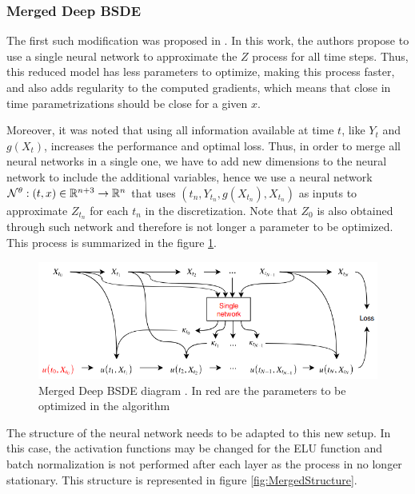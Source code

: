 \subsubsection*{Merged Deep BSDE}
The first such modification was proposed in \cite{chan-wai-nam_machine_2018}. In this work, the authors propose to use a single neural network to approximate the $Z$ process for all time steps. Thus, this reduced model has less parameters to optimize, making this process faster, and also adds regularity to the computed gradients, which means that close in time parametrizations should be close for a given $x$.

Moreover, it was noted that using all information available at time $t$, like $Y_t$ and $g(X_t)$, increases the performance and optimal loss. Thus, in order to merge all neural networks in a single one, we have to add new dimensions to the neural network to include the additional variables, hence we use a neural network $\mathcal{N}^{\theta}:(t,x)\in \mathbb{R}^{n+3}\to\mathbb{R}^n$ that uses $(t_n,Y_{t_n},g(X_{t_n}),X_{t_n})$ as inputs to approximate $Z_{t_{n}}$ for each $t_n$ in the discretization. Note that $Z_0$ is also obtained through such network and therefore is not longer a parameter to be optimized. This process is summarized in the figure \ref{fig:mergeddeepbsdemap}.
\begin{figure}[H]
	\centering
	\includegraphics[width=\linewidth]{images/MergedBSDE}
	\caption{Merged Deep BSDE diagram \cite{chan-wai-nam_machine_2018}. In red are the parameters to be optimized in the algorithm }
	\label{fig:mergeddeepbsdemap}
\end{figure}

The structure of the neural network needs to be adapted to this new setup. In this case, the activation functions may be changed for the ELU function and batch normalization is not performed after each layer as the process in no longer stationary. This structure is represented in figure \ref{fig:MergedStructure}.

